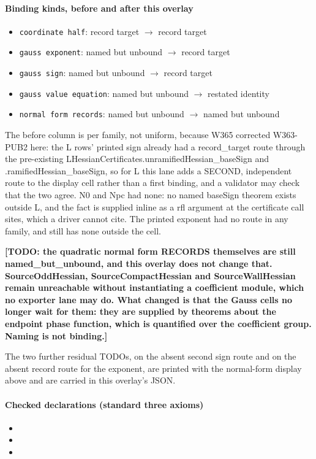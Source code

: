 \paragraph{Binding kinds, before and after this overlay}
\begin{itemize}
\item \texttt{coordinate half}: record target $\to$ record target
\item \texttt{gauss exponent}: named but unbound $\to$ record target
\item \texttt{gauss sign}: named but unbound $\to$ record target
\item \texttt{gauss value equation}: named but unbound $\to$ restated identity
\item \texttt{normal form records}: named but unbound $\to$ named but unbound
\end{itemize}
\par\noindent The before column is per family, not uniform, because W365 corrected W363-PUB2 here: the L rows' printed sign already had a record\_target route through the pre-existing LHessianCertificates.unramifiedHessian\_baseSign and .ramifiedHessian\_baseSign, so for L this lane adds a SECOND, independent route to the display cell rather than a first binding, and a validator may check that the two agree. N0 and Npc had none: no named baseSign theorem exists outside L, and the fact is supplied inline as a rfl argument at the certificate call sites, which a driver cannot cite. The printed exponent had no route in any family, and still has none outside the cell.
\par\noindent\textbf{[TODO: the quadratic normal form RECORDS themselves are still named\_but\_unbound, and this overlay does not change that. SourceOddHessian, SourceCompactHessian and SourceWallHessian remain unreachable without instantiating a coefficient module, which no exporter lane may do. What changed is that the Gauss cells no longer wait for them: they are supplied by theorems about the endpoint phase function, which is quantified over the coefficient group. Naming is not binding.]}
\par\noindent The two further residual TODOs, on the absent second sign route and on the absent record route for the exponent, are printed with the normal-form display above and are carried in this overlay's JSON.
\paragraph{Checked declarations (standard three axioms)}
\begin{itemize}
\item {}
\item {}
\item {}
\end{itemize}
